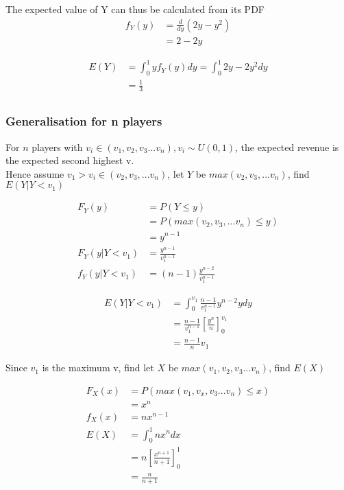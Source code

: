 \documentclass[10pt, a4paper]{article}
\begin{document}
The expected value of Y can thus be calculated from its PDF
\begin{align*}
   f_Y(y) &= \frac{d}{dy} (2y - y^2) \\ 
          &= 2 - 2y \nonumber 
\end{align*}

\begin{align*}
   E(Y) &= \int_0^1 y f_Y(y) dy = \int_0^1 2y - 2y^2 dy \\ 
        &= \frac{1}{3} \nonumber \\
\end{align*}

\subsubsection{Generalisation for n players}
For $n$ players with $v_i \in \left(v_1, v_2, v_3 ... v_n\right), v_i \sim U(0,1)$, the expected revenue is the expected second highest v.  \\

Hence assume $v_1 > v_i \in (v_2, v_3, ... v_n)$, let $Y$ be $max(v_2, v_3, ... v_n)$, find $E(Y|Y < v_1)$ 

\begin{align*}
   F_Y(y) &= P(Y \le y) \\
          &= P(max(v_2, v_3, ... v_n) \le y) \\ 
          &= y^{n-1} \\ 
   F_Y(y | Y < v_1) &= \frac{y^{n-1}}{v_1^{n-1}} \\
   f_Y(y | Y < v_1) &= (n-1)\frac{y^{n-2}}{v_1^{n-1}} 
\end{align*}

\begin{align*}
   E(Y | Y < v_1) &= \int_0^{v_1} \frac{n-1}{v_1^{n-1}} y^{n-2} y dy \nonumber \\
                  &= \frac{n-1}{v_1^{n-1}} \left[ \frac{y^n}{n}\right]^{v_1}_0 \\
                  &= \frac{n-1}{n} v_1
\end{align*}

Since $v_1$ is the maximum v, find let $X$ be $max(v_1, v_2, v_3 ... v_n)$, find $E(X)$

\begin{align*}
   F_X(x) &= P(max(v_1, v_x, v_3... v_n) \le x) \\
          &= x^n \\
   f_X(x) &= nx^{n-1} \\
   E(X) &= \int _0^1 n x^n dx  \\
        &= n \left[ \frac{x^{n+1}}{n+1}\right]^1_0 \\
        &= \frac{n}{n+1}
\end{align*}
\end{document}
